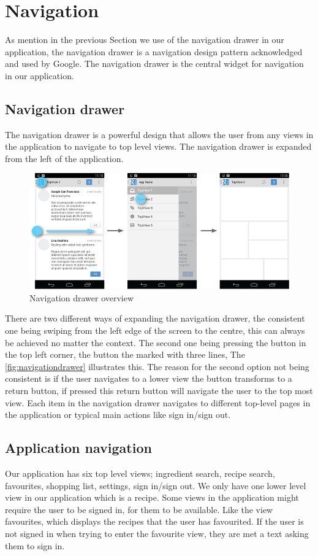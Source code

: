\section{Navigation}\label{sec:navigation}
As mention in the previous Section we use of the navigation drawer in our application, the navigation drawer is a navigation design pattern acknowledged and used by Google.\cite{guidelines-navigationdrawer} The navigation drawer is the central widget for navigation in our application.
 
\subsection{Navigation drawer}
The navigation drawer is a powerful design that allows the user from any views in the application to navigate to top level views. The navigation drawer is expanded from the left of the application.
\begin{figure}[H]
\centering
\includegraphics[width=0.9\linewidth]{img/screenshots/navigation_drawer_overview.png}
\caption{Navigation drawer overview \cite{guidelines-navigationdrawer}}
\label{fig:navigationdrawer}
\end{figure}
There are two different ways of expanding the navigation drawer, the consistent one being swiping from the left edge of the screen to the centre, this can always be achieved no matter the context. 
The second one being pressing the button in the top left corner, the button the marked with three lines, The \autoref{fig:navigationdrawer} illustrates this. 
The reason for the second option not being consistent is if the user navigates to a lower view the button transforms to a return button, if pressed this return button will navigate the user to the top most view. 
Each item in the navigation drawer navigates to different top-level pages in the application or typical main actions like sign in/sign out.

\subsection{Application navigation}
Our application has six top level views; ingredient search, recipe search, favourites, shopping list, settings, sign in/sign out. 
We only have one lower level view in our application which is a recipe. Some views in the application might require the user to be signed in, for them to be available. 
Like the view favourites, which displays the recipes that the user has favourited. 
If the user is not signed in when trying to enter the favourite view, they are met a text asking them to sign in.
